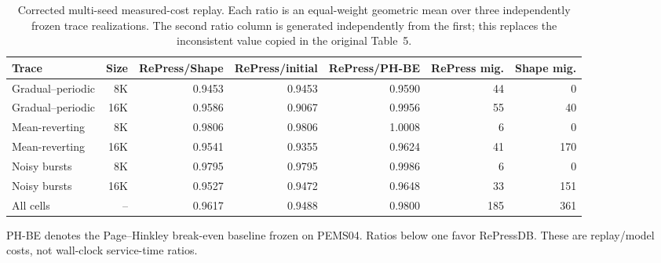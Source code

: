 \begin{table}[t]
\centering
\caption{Corrected multi-seed measured-cost replay. Each ratio is an equal-weight geometric mean over three independently frozen trace realizations. The second ratio column is generated independently from the first; this replaces the inconsistent value copied in the original Table~5.}
\label{tab:multiseed_cost}
\begin{threeparttable}
\begin{tabular}{@{}lrrrrrr@{}}
\toprule
Trace & Size & RePress/Shape & RePress/initial & RePress/PH-BE & RePress mig. & Shape mig. \\
\midrule
Gradual--periodic & 8K & 0.9453 & 0.9453 & 0.9590 & 44 & 0 \\
Gradual--periodic & 16K & 0.9586 & 0.9067 & 0.9956 & 55 & 40 \\
Mean-reverting & 8K & 0.9806 & 0.9806 & 1.0008 & 6 & 0 \\
Mean-reverting & 16K & 0.9541 & 0.9355 & 0.9624 & 41 & 170 \\
Noisy bursts & 8K & 0.9795 & 0.9795 & 0.9986 & 6 & 0 \\
Noisy bursts & 16K & 0.9527 & 0.9472 & 0.9648 & 33 & 151 \\
\midrule
All cells & -- & 0.9617 & 0.9488 & 0.9800 & 185 & 361 \\
\bottomrule
\end{tabular}
\begin{tablenotes}[flushleft]\footnotesize
\item PH-BE denotes the Page--Hinkley break-even baseline frozen on PEMS04. Ratios below one favor RePressDB. These are replay/model costs, not wall-clock service-time ratios.
\end{tablenotes}
\end{threeparttable}
\end{table}
